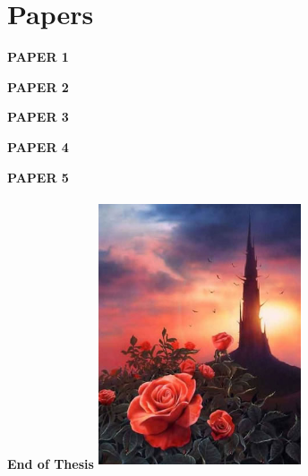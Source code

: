 \documentclass[
  12pt,
]{book}
\begin{document}
\backmatter

\chapter{Papers}
\newpage

\begin{center}
\textbf{\fontsize{70}{1} \selectfont PAPER 1}
\end{center}



\begin{center}
\textbf{\fontsize{70}{1} \selectfont PAPER 2}
\end{center}



\begin{center}
\textbf{\fontsize{70}{1} \selectfont PAPER 3}
\end{center}



\begin{center}
\textbf{\fontsize{70}{1} \selectfont PAPER 4}
\end{center}



\begin{center}
\textbf{\fontsize{70}{1} \selectfont PAPER 5}
\end{center}



\begin{center}
\textbf{\fontsize{70}{1} \selectfont End of Thesis}
\vfill
\includegraphics[width=6cm, height=8cm]{img/rose.jpg}
\end{center}

%
\end{document}
